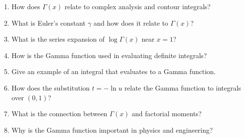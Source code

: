 \begin{enumerate}
  \item How does \(\Gamma(x)\) relate to complex analysis and contour integrals?
  \item What is Euler's constant \(\gamma\) and how does it relate to \(\Gamma(x)\)?
  \item What is the series expansion of \(\log \Gamma(x)\) near \(x=1\)?
  \item How is the Gamma function used in evaluating definite integrals?
  \item Give an example of an integral that evaluates to a Gamma function.
  \item How does the substitution \(t = -\ln u\) relate the Gamma function to integrals over \((0,1)\)?
  \item What is the connection between \(\Gamma(x)\) and factorial moments?
  \item Why is the Gamma function important in physics and engineering?
\end{enumerate}

